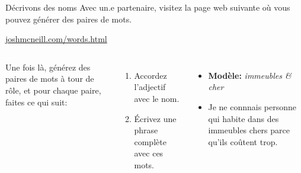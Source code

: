 \begin{frame}{Décrivons des noms}
  Avec un.e partenaire, visitez la page web suivante où vous pouvez générer des paires de mots.
  \begin{center}
    \href{https://joshmcneill.com/words.html}{joshmcneill.com/words.html}
  \end{center}
  \begin{columns}
      Une fois là, générez des paires de mots à tour de rôle, et pour chaque paire, faites ce qui suit:
      \begin{enumerate}
        \item Accordez l'adjectif avec le nom.
        \item Écrivez une phrase complète avec ces mots.
      \end{enumerate}
      \begin{itemize}
        \item[] \textbf{Modèle:} \emph{immeubles \& cher}
        \item Je ne connnais personne qui habite dans des \alert{immeubles chers} parce qu'ils coûtent trop.
      \end{itemize}
  \end{columns}
\end{frame}